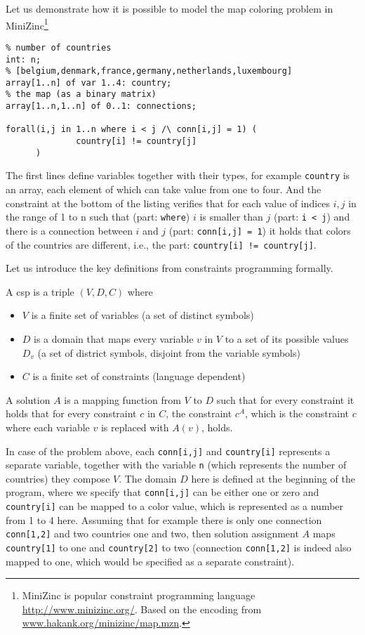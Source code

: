 Let us demonstrate how it is possible to model the map coloring problem in MiniZinc\footnote{MiniZinc is popular constraint programming language \url{http://www.minizinc.org/}. Based on the encoding from \url{www.hakank.org/minizinc/map.mzn}.}  
\begin{lstlisting}
% number of countries
int: n; 
% [belgium,denmark,france,germany,netherlands,luxembourg]
array[1..n] of var 1..4: country; 
% the map (as a binary matrix)
array[1..n,1..n] of 0..1: connections; 

forall(i,j in 1..n where i < j /\ conn[i,j] = 1) (
              country[i] != country[j]
      )
\end{lstlisting}
The first lines define variables together with their types, for example \texttt{country} is an array, each element of which can take value from one to four. And the constraint at the bottom of the listing verifies that for each value of indices $i,j$ in the range of 1 to n such that (part: \texttt{where}) $i$ is smaller than $j$ (part: \texttt{i < j}) and there is a connection between $i$ and $j$ (part: \texttt{conn[i,j] = 1}) it holds that colors of the countries are different, i.e., the part: \texttt{country[i] != country[j]}.

Let us introduce the key definitions from constraints programming formally.
\begin{definition}
    A \acrshort{csp} is a triple $(V,D,C)$ where
    \begin{itemize}
        \item $V$ is a finite set of variables (a set of distinct symbols)
        \item $D$ is a domain that maps every variable $v$ in $V$ to a set of its possible values $D_v$ (a set of district symbols, disjoint from the variable symbols)
        \item $C$ is a finite set of constraints (language dependent)
    \end{itemize}
\end{definition}

A solution $A$ is a mapping function from $V$ to $D$ such that for every constraint it holds that for every constraint $c$ in $C$, the constraint $c^A$, which is the constraint $c$ where each variable $v$ is replaced with $A(v)$, holds.

In case of the problem above, each \texttt{conn[i,j]} and \texttt{country[i]} represents a separate variable, together with the variable \texttt{n} (which represents the number of countries) they compose $V$. The domain $D$ here is defined at the beginning of the program, where we specify that \texttt{conn[i,j]} can be either one or zero and \texttt{country[i]} can be mapped to a color value, which is represented as a number from 1 to 4 here. Assuming that for example there is only one connection \texttt{conn[1,2]} and two countries one and two, then solution assignment $A$ maps \texttt{country[1]} to one and \texttt{country[2]} to two (connection \texttt{conn[1,2]} is indeed also mapped to one, which would be specified as a separate constraint).

